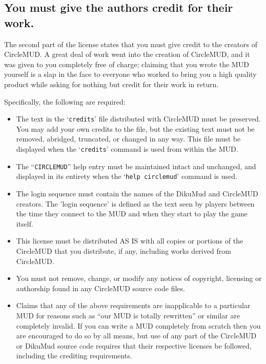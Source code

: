 \documentclass[11pt]{article}
\begin{document}
\subsection{You must give the authors credit for their work.}
The second part of the license states that you must give credit to the creators of CircleMUD.  A great deal of work went into the creation of CircleMUD, and it was given to you completely free of charge; claiming that you wrote the MUD yourself is a slap in the face to everyone who worked to bring you a high quality product while asking for nothing but credit for their work in return.
\par
Specifically, the following are required:
\begin{itemize}
\item The text in the `\texttt{credits}' file distributed with CircleMUD must be preserved.  You may add your own credits to the file, but the existing text must not be removed, abridged, truncated, or changed in any way. This file must be displayed when the `\texttt{credits}' command is used from within the MUD.
\item The ``\texttt{CIRCLEMUD}'' help entry must be maintained intact and unchanged, and displayed in its entirety when the `\texttt{help circlemud}' command is used.
\item The login sequence must contain the names of the DikuMud and CircleMUD creators.  The 'login sequence' is defined as the text seen by players between the time they connect to the MUD and when they start to play the game itself.
\item This license must be distributed AS IS with all copies or portions of the CircleMUD that you distribute, if any, including works derived from CircleMUD.
\item You must not remove, change, or modify any notices of copyright, licensing or authorship found in any CircleMUD source code files.
\item Claims that any of the above requirements are inapplicable to a particular MUD for reasons such as ``our MUD is totally rewritten'' or similar are completely invalid.  If you can write a MUD completely from scratch then you are encouraged to do so by all means, but use of any part of the CircleMUD or DikuMud source code requires that their respective licenses be followed, including the crediting requirements.
\end{itemize}
\end{document}
